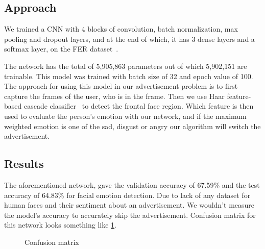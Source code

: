 \documentclass[10pt,twocolumn,letterpaper]{article}
\begin{document}
\subsection{Approach}

We trained a CNN with 4 blocks of convolution, batch normalization, max pooling and dropout layers, and at the end of which, it has 3 dense layers and a softmax layer, on the FER dataset~\cite{FER2013}.

The network has the total of 5,905,863 parameters out of which 5,902,151 are trainable. This model was trained with batch size of 32 and epoch value of 100. The approach for using this model in our advertisement problem is to first capture the frames of the user, who is in the frame. Then we use Haar feature-based cascade classifier~\cite{HaarCascade} to detect the frontal face region. Which feature is then used to evaluate the person's emotion with our network, and if the maximum weighted emotion is one of the sad, disgust or angry our algorithm will switch the advertisement.

\subsection{Results}
The aforementioned network, gave the validation accuracy of 67.59\% and the test accuracy of 64.83\% for facial emotion detection. Due to lack of any dataset for human faces and their sentiment about an advertisement. We wouldn't measure the model's accuracy to accurately skip the advertisement. Confusion matrix for this network looks something like \ref{confusion_mat}.

\begin{figure}[t]
	\begin{center}
	\end{center}
	\caption{Confusion matrix}
	\label{confusion_mat}
\end{figure}
\end{document}
